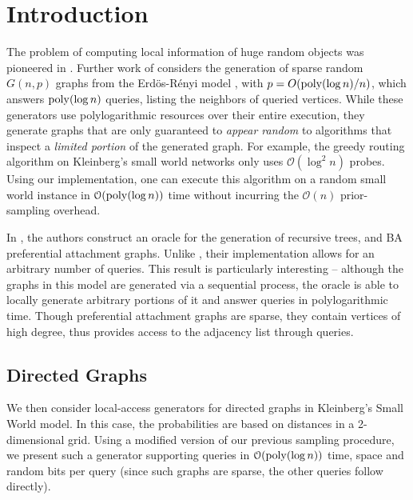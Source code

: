 \section{Introduction}
The problem of computing local information of huge random objects was pioneered in \cite{huge_old,huge}.
Further work of \cite{sparse} considers the generation of sparse random $G(n,p)$ graphs from the Erd\"{o}s-R\'{e}nyi model \cite{er},
with $p = O(\mathrm{poly}(\log n)/n)$, which answers $\mathrm{poly}(\log n)$  queries, listing the neighbors of queried vertices.
While these generators use polylogarithmic resources over their entire execution,
they generate graphs that are  only guaranteed to {\em appear random} to algorithms that inspect a {\em limited portion} of the generated graph.
For example, the greedy routing algorithm on Kleinberg's small world networks \cite{kleinberg} only uses $\mathcal O(\log^2 n)$ probes.
Using our implementation, one can execute this algorithm on a random small world instance
in $\mathcal O(\mathrm{poly}(\log n))$ time without incurring the $\mathcal O(n)$ prior-sampling overhead.

In \cite{reut}, the authors construct an oracle for the generation of recursive trees, and BA preferential attachment graphs.
Unlike \cite{sparse}, their implementation allows for an arbitrary number of queries.
This result is particularly interesting --  although the graphs in this model are generated via a sequential process,
the oracle is able to locally generate arbitrary portions of it and answer queries in polylogarithmic time.
Though preferential attachment graphs are sparse, they contain vertices of high degree,
thus \cite{reut} provides access to the adjacency list through  queries.



\subsection{Directed Graphs}
\label{sec:directed_graphs}
We then consider local-access generators for directed graphs in Kleinberg's Small World model.
In this case, the probabilities are based on distances in a 2-dimensional grid.
Using a modified version of our previous sampling procedure, we present such a generator supporting  queries in
$\mathcal{O}(\mathrm{poly}(\log n))$ time, space and random bits per query (since such graphs are sparse, the other queries follow directly).

